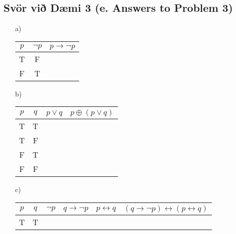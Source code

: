 \subsection*{Svör við Dæmi 3 (e. Answers to Problem 3)}
\begin{itemize}
    \item[a)]
        \begin{minipage}[t]{\linewidth}
            \renewcommand{\arraystretch}{1.5} 
            \setlength{\tabcolsep}{12pt} 
            \begin{tabular}{ |c|c|c| } 
                \hline
                $p$ & $\neg p$ & $p \to \neg p$\\
                \hline
                T & F &  \\
                \hline
                F & T &  \\ 
                \hline
            \end{tabular}
        \end{minipage}
    \item[b)]
        \begin{minipage}[t]{\linewidth}
            \renewcommand{\arraystretch}{1.5} 
            \setlength{\tabcolsep}{12pt} 
            \begin{tabular}{ |c|c|c|c| }
                \hline
                $p$ & $q$ & $p \lor q$ & $p \oplus (p \lor q)$\\
                \hline
                T & T &  &  \\
                \hline
                T & F &  &  \\
                \hline
                F & T &  &  \\
                \hline
                F & F &  &  \\
                \hline
            \end{tabular}
        \end{minipage}
    \item[c)]
        \begin{minipage}[t]{\linewidth}
            \renewcommand{\arraystretch}{1.5} 
            \setlength{\tabcolsep}{12pt} 
            \begin{tabular}{ |c|c|c|c|c|c| } 
                \hline
                $p$ & $q$ & $\neg p$ & $q \to \neg p$ & $p \leftrightarrow q$ & $(q \to \neg p)\leftrightarrow (p \leftrightarrow q)$\\
                \hline
                T & T &  &  &  &  \\ 
                \hline

\end{tabular}
\end{minipage}
\end{itemize}
